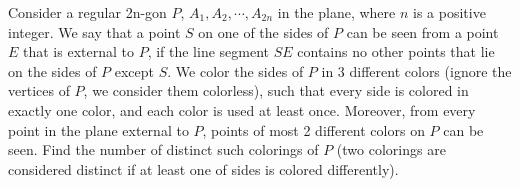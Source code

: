 Consider a regular 2n-gon $P$, $A_1,A_2,\cdots ,A_{2n}$ in the plane, where $n$ is a positive integer.
We say that a point $S$ on one of the sides of $P$ can be seen from a point $E$ that is external to $P$, if the line segment $SE$ contains no other points that lie on the sides of $P$ except $S$.
We color the sides of $P$ in 3 different colors (ignore the vertices of $P$, we consider them colorless), such that every side is colored in exactly one color, and each color is used at least once.
Moreover, from every point in the plane external to $P$, points of most 2 different colors on $P$ can be seen.
Find the number of distinct such colorings of $P$ (two colorings are considered distinct if at least one of sides is colored differently).
